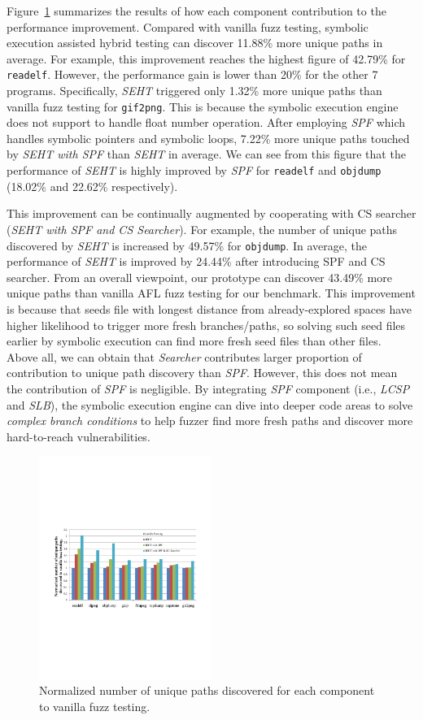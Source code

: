 Figure~\ref{path-overall-rsults} summarizes the results of how each component contribution to the performance improvement. 
Compared with vanilla fuzz testing, symbolic execution assisted hybrid testing can discover 11.88\% more unique paths in average.
 For example, this improvement reaches the highest figure of 42.79\% for \texttt{readelf}.
 However, the performance gain is lower than 20\% for the other 7 programs.
  Specifically, \textit{SEHT} triggered only 1.32\% more unique paths than vanilla fuzz testing for \texttt{gif2png}.
  This is because the symbolic execution engine does not support to handle float number operation.
 After employing \textit{SPF} which handles symbolic pointers and symbolic loops, 7.22\% more unique paths touched by \textit{SEHT with SPF} than \textit{SEHT} in average. 
  We can see from this figure that the performance of \textit{SEHT} is highly improved by \textit{SPF} for \texttt{readelf} and \texttt{objdump} (18.02\% and 22.62\% respectively).
 
 This improvement can be continually augmented by cooperating with CS searcher (\textit{SEHT with SPF and CS Searcher}). 
  For example, the number of unique paths discovered by \textit{SEHT} is increased by 49.57\% for \texttt{objdump}.
  In average, the performance of \textit{SEHT} is improved by 24.44\% after introducing SPF and CS searcher. 
 From an overall viewpoint, our prototype can discover 43.49\% more unique paths than vanilla AFL fuzz testing for our benchmark. 
  This improvement is because that seeds file with longest distance from already-explored spaces have higher likelihood to trigger more fresh branches/paths, so solving such seed files earlier by symbolic execution can find more fresh seed files than other files. \\

 
Above all, we can obtain that \textit{Searcher} contributes larger proportion of contribution to unique path discovery than \textit{SPF}. However, this does not mean the contribution of \textit{SPF} is negligible. By integrating \textit{SPF} component (i.e., \textit{LCSP} and \textit{SLB}), the symbolic execution engine can dive into deeper code areas to solve \textit{complex branch conditions} to help fuzzer find more fresh paths and discover more hard-to-reach vulnerabilities.

      
\begin{figure}
\begin{center}
\includegraphics[width=0.5\textwidth]{figures/path-discovery-SPF-CS-all.pdf} 
\caption{Normalized number of unique paths discovered for each component to vanilla fuzz testing.}\label{path-overall-rsults}
\end{center}
\end{figure}